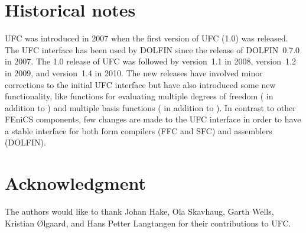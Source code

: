 \section{Historical notes}

UFC was introduced in 2007 when the first version of UFC (1.0) was
released. The UFC interface has been used by DOLFIN since the release
of DOLFIN~0.7.0 in 2007. The 1.0 release of UFC was followed by
version~1.1 in 2008, version~1.2 in 2009, and version~1.4 in 2010. The
new releases have involved minor corrections to the initial UFC
interface but have also introduced some new functionality, like
functions for evaluating multiple degrees of freedom
( in addition to ) and multiple
basis functions ( in addition to
). In contrast to other FEniCS components, few
changes are made to the UFC interface in order to have a stable
interface for both form compilers (FFC and SFC) and assemblers
(DOLFIN).

\section*{Acknowledgment}

The authors would like to thank Johan Hake, Ola
Skavhaug, Garth Wells, Kristian \O{}lgaard, and Hans Petter
Langtangen for their contributions to UFC.
